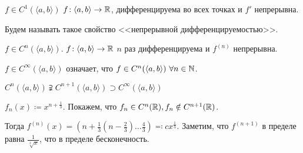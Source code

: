 \begin{definition}
    $f \in C^1(\langle a, b \rangle)$  $f\!: \langle a, b \rangle \to \mathbb{R}$, дифференцируема во всех точках и  $f'$ непрерывна.

    Будем называть такое свойство <<непрерывной дифференцируемостью>>.
\end{definition}
\begin{definition}
    $f \in C^n(\langle a, b \rangle)$. $f\!: \langle a, b \rangle \to \mathbb{R}$  $n$ раз дифференцируема и  $f^{(n)}$ непрерывна.
\end{definition}
\begin{definition}
    $f \in C^{\infty}(\langle a, b \rangle)$ означает, что  $f \in C^n(\langle a, b \rangle)\ \forall n \in \mathbb{N}$.
\end{definition}
\begin{remark}
    $C^n(\langle a, b \rangle) \supsetneqq C^{n+1}(\langle a, b \rangle) \supset C^{\infty}(\langle a, b \rangle)$
\end{remark}
\begin{example}
    $f_n(x) \coloneqq x^{n + \frac{1}{3}}$. Покажем, что $f_n \in C^n(\mathbb{R}), f_n \notin C^{n+1}(\mathbb{R})$.

    Тогда  $f^{(n)}(x) = (n+\frac{1}{3}(n-\frac{2}{3})\ldots \frac{4}{3}) \eqqcolon cx^{\frac{1}{3}}$. Заметим, что $f^{(n+1)}$ в пределе равна  $\frac{1}{\sqrt[3]{x}}$, что в пределе бесконечность.
\end{example}

